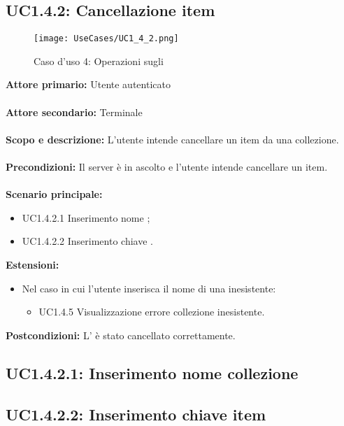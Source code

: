 \documentclass{scalatekids-article}
\begin{document}
\subsection{UC1.4.2: Cancellazione item}

\begin{figure}[H]
  \begin{center}
    \texttt{[image: UseCases/UC1\_4\_2.png]}
    \caption*{Caso d'uso 4: Operazioni sugli }
  \end{center}
\end{figure}
\textbf{Attore primario:} Utente autenticato\\ \\
\textbf{Attore secondario:} Terminale\\ \\
\textbf{Scopo e descrizione:} L'utente intende cancellare un item da una collezione.\\ \\
\textbf{Precondizioni:} Il server è in ascolto e l'utente intende cancellare un item.\\ \\
\textbf{Scenario principale:}
\begin{itemize}
\item UC1.4.2.1 Inserimento nome ;
\item UC1.4.2.2 Inserimento chiave .
\end{itemize}
\textbf{Estensioni:}
\begin{itemize}
\item Nel caso in cui l'utente inserisca il nome di una  inesistente:
  \begin{itemize}
  \item UC1.4.5 Visualizzazione errore collezione inesistente.
  \end{itemize}
\end{itemize}
\textbf{Postcondizioni:} L' è stato cancellato correttamente.

\subsection{UC1.4.2.1: Inserimento nome collezione}

\subsection{UC1.4.2.2: Inserimento chiave item}
\end{document}
